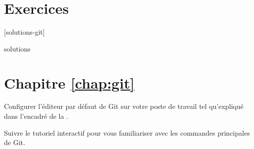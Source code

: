 \endgroup                       %


\section{Exercices}
\label{sec:git:exercices}

[solutions-git]

\begin{Filesave}{solutions}
\section*{Chapitre \ref*{chap:git}}

\end{Filesave}

\begin{exercice}[nosol]
  Configurer l'éditeur par défaut de Git sur votre poste de travail
  tel qu'expliqué dans l'encadré de la .
\end{exercice}


\begin{exercice}[nosol]
  Suivre le tutoriel interactif 
  pour vous familiariser avec les commandes principales de Git.
\end{exercice}

